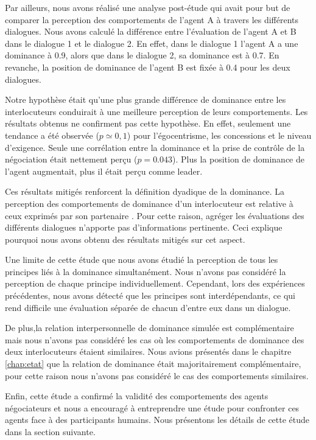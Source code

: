 {				Par ailleurs, nous avons réalisé une analyse post-étude qui avait pour but de comparer la perception des comportements de l'agent A à travers les différents dialogues. 
				Nous avons calculé la différence entre l'évaluation de l'agent A et B dans le dialogue 1 et le dialogue 2. En effet, dans le dialogue 1 l'agent A a une dominance à 0.9, alors que dans le dialogue 2, sa dominance est à 0.7. En revanche, la position de dominance de l'agent B est fixée à 0.4 pour les deux dialogues. 
				
				Notre hypothèse était qu'une plus grande différence de dominance entre les interlocuteurs conduirait à une meilleure perception de leurs comportements. Les résultats obtenus ne confirment pas cette hypothèse. En effet, seulement une tendance a été observée ($ p \simeq 0,1 $) pour l'égocentrisme, les concessions et le niveau d'exigence. Seule une corrélation entre la dominance et la prise de contrôle de la négociation était nettement perçu ($p = 0.043$). Plus la position de dominance de l'agent augmentait, plus il était perçu comme leader. 
				
				Ces résultats mitigés renforcent la définition dyadique de la dominance. La perception des comportements de dominance d'un interlocuteur est relative à ceux exprimés par son partenaire \cite{dunbar2005perceptions}. 
				Pour cette raison, agréger les évaluations des différents dialogues n'apporte pas d'informations pertinente. Ceci explique pourquoi nous avons obtenu des résultats mitigés sur cet aspect.
				
				Une limite de cette étude que nous avons étudié la perception de tous les principes liés à la dominance simultanément. Nous n'avons pas considéré la perception de chaque principe individuellement. Cependant, lors des expériences précédentes, nous avons détecté que les principes sont interdépendants, ce qui rend difficile une évaluation séparée de chacun d'entre eux dans un dialogue.
				
				De plus,la relation interpersonnelle de dominance simulée est complémentaire mais nous n'avons pas considéré les cas où les comportements de dominance des deux interlocuteurs étaient similaires. Nous avions présentés dans le chapitre \ref{chap:etat} que la relation de dominance était majoritairement complémentaire, pour cette raison nous n'avons pas considéré le cas des comportements similaires. 
				
				Enfin, cette étude a confirmé la validité des comportements des agents négociateurs et nous a encouragé à entreprendre une étude pour confronter ces agents face à des participants humains. Nous présentons les détails de cette étude dans la section suivante.
				
}

